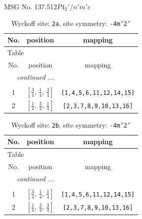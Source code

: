 \documentclass[fleqn,8pt]{jsarticle}
\begin{document}
\setcounter{MaxMatrixCols}{32}

\renewcommand{\tablename}{Table~}
\renewcommand{\figurename}{Figure~}
\begin{center}
\LARGE
MSG No. 137.512\quad$P4_{2}'/n'm'c$
\end{center}
\renewcommand{\arraystretch}{1.2}
\begin{longtable}{ccc}
\caption{Wyckoff site: {\tt 2a}, site symmetry: {\tt -4m'2'}}
 \\
 \hline \hline
No. & position & mapping \\ \hline \endfirsthead

\multicolumn{2}{l}{\tablename\ \thetable{}} \\
 \hline \hline
No. & position & mapping \\ \hline \endhead

 \hline \hline
\multicolumn{2}{r}{\footnotesize\it continued ...} \\ \endfoot

 \hline \hline
\multicolumn{2}{r}{} \\ \endlastfoot

1 & $\left[ \frac{3}{4},\, \frac{1}{4},\, \frac{3}{4} \right]$ & {\tt [1,4,5,6,11,12,14,15]} \\ \hline
2 & $\left[ \frac{1}{4},\, \frac{3}{4},\, \frac{1}{4} \right]$ & {\tt [2,3,7,8,9,10,13,16]} \\
\end{longtable}
\renewcommand{\arraystretch}{1.2}
\begin{longtable}{ccc}
\caption{Wyckoff site: {\tt 2b}, site symmetry: {\tt -4m'2'}}
 \\
 \hline \hline
No. & position & mapping \\ \hline \endfirsthead

\multicolumn{2}{l}{\tablename\ \thetable{}} \\
 \hline \hline
No. & position & mapping \\ \hline \endhead

 \hline \hline
\multicolumn{2}{r}{\footnotesize\it continued ...} \\ \endfoot

 \hline \hline
\multicolumn{2}{r}{} \\ \endlastfoot

1 & $\left[ \frac{3}{4},\, \frac{1}{4},\, \frac{1}{4} \right]$ & {\tt [1,4,5,6,11,12,14,15]} \\ \hline
2 & $\left[ \frac{1}{4},\, \frac{3}{4},\, \frac{3}{4} \right]$ & {\tt [2,3,7,8,9,10,13,16]} \\
\end{longtable}
\end{document}
